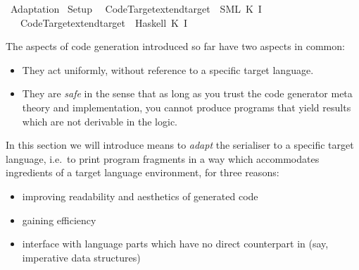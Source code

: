 %
\begin{isabellebody}%
\def\isabellecontext{Adaptation}%
%
\isadelimtheory
%
\endisadelimtheory
%
\isatagtheory
{}\isamarkupfalse%
\ Adaptation\isanewline
{}\ Setup\isanewline
{}%
\endisatagtheory
{\isafoldtheory}%
%
\isadelimtheory
\isanewline
%
\endisadelimtheory
%
\isadeliminvisible
\isanewline
%
\endisadeliminvisible
%
\isataginvisible
{}\isamarkupfalse%
\ {\isacharverbatimopen}\ Code{\isacharunderscore}Target{\isachardot}extend{\isacharunderscore}target\ {\isacharparenleft}{\isachardoublequote}{\isasymSML}{\isachardoublequote}{\isacharcomma}\ {\isacharparenleft}{\isachardoublequote}SML{\isachardoublequote}{\isacharcomma}\ K\ I{\isacharparenright}{\isacharparenright}\isanewline
\ \ {\isacharhash}{\isachargreater}\ Code{\isacharunderscore}Target{\isachardot}extend{\isacharunderscore}target\ {\isacharparenleft}{\isachardoublequote}{\isasymSMLdummy}{\isachardoublequote}{\isacharcomma}\ {\isacharparenleft}{\isachardoublequote}Haskell{\isachardoublequote}{\isacharcomma}\ K\ I{\isacharparenright}{\isacharparenright}\ {\isacharverbatimclose}%
\endisataginvisible
{\isafoldinvisible}%
%
\isadeliminvisible
%
\endisadeliminvisible
%
\isamarkuptrue%
%
\isamarkuptrue%
%
\begin{isamarkuptext}%
The aspects of code generation introduced so far have two aspects
  in common:

  \begin{itemize}

    \item They act uniformly, without reference to a specific target
       language.

    \item They are \emph{safe} in the sense that as long as you trust
       the code generator meta theory and implementation, you cannot
       produce programs that yield results which are not derivable in
       the logic.

  \end{itemize}

  \noindent In this section we will introduce means to \emph{adapt}
  the serialiser to a specific target language, i.e.~to print program
  fragments in a way which accommodates 
  ingredients of a target language environment, for three reasons:

  \begin{itemize}
    \item improving readability and aesthetics of generated code
    \item gaining efficiency
    \item interface with language parts which have no direct counterpart
      in  (say, imperative data structures)
  \end{itemize}


\end{isamarkuptext}
\end{isabellebody}
